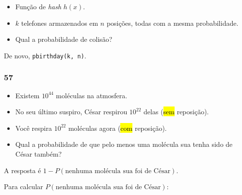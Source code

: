 \documentclass[
  11pt]{report}
\begin{document}
\begin{rmdbox}

\begin{itemize}
\item
  Função de \emph{hash} $h(x)$.
\item
  $k$ telefones armazenados em $n$ posições, todas com a mesma probabilidade.
\item
  Qual a probabilidade de colisão?
\end{itemize}

\end{rmdbox}

De novo, \texttt{pbirthday(k,\ n)}.

\hypertarget{section-7}{%
\subsubsection*{57}\label{section-7}}

\begin{rmdbox}

\begin{itemize}
\item
  Existem $10^{44}$ moléculas na atmosfera.
\item
  No seu último suspiro, César respirou $10^{22}$ delas ({\hl{sem}} reposição).
\item
  Você respira $10^{22}$ moléculas agora ({\hl{com}} reposição).
\item
  Qual a probabilidade de que pelo menos uma molécula sua tenha sido de César também?
\end{itemize}

\end{rmdbox}

A resposta é $1 - P(\text{nenhuma molécula sua foi de César})$.

Para calcular $P(\text{nenhuma molécula sua foi de César})$:
\end{document}
